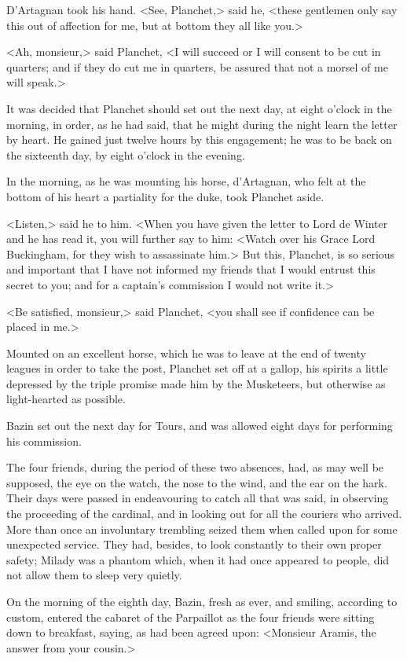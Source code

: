 D'Artagnan took his hand. <See, Planchet,> said he, <these gentlemen only say this out of affection for me, but at bottom they all like you.> 

<Ah, monsieur,> said Planchet, <I will succeed or I will consent to be cut in quarters; and if they do cut me in quarters, be assured that not a morsel of me will speak.> 

It was decided that Planchet should set out the next day, at eight o'clock in the morning, in order, as he had said, that he might during the night learn the letter by heart. He gained just twelve hours by this engagement; he was to be back on the sixteenth day, by eight o'clock in the evening. 

In the morning, as he was mounting his horse, d'Artagnan, who felt at the bottom of his heart a partiality for the duke, took Planchet aside. 

<Listen,> said he to him. <When you have given the letter to Lord de Winter and he has read it, you will further say to him: <Watch over his Grace Lord Buckingham, for they wish to assassinate him.> But this, Planchet, is so serious and important that I have not informed my friends that I would entrust this secret to you; and for a captain's commission I would not write it.>

<Be satisfied, monsieur,> said Planchet, <you shall see if confidence can be placed in me.> 

Mounted on an excellent horse, which he was to leave at the end of twenty leagues in order to take the post, Planchet set off at a gallop, his spirits a little depressed by the triple promise made him by the Musketeers, but otherwise as light-hearted as possible. 

Bazin set out the next day for Tours, and was allowed eight days for performing his commission. 

The four friends, during the period of these two absences, had, as may well be supposed, the eye on the watch, the nose to the wind, and the ear on the hark. Their days were passed in endeavouring to catch all that was said, in observing the proceeding of the cardinal, and in looking out for all the couriers who arrived. More than once an involuntary trembling seized them when called upon for some unexpected service. They had, besides, to look constantly to their own proper safety; Milady was a phantom which, when it had once appeared to people, did not allow them to sleep very quietly. 

On the morning of the eighth day, Bazin, fresh as ever, and smiling, according to custom, entered the cabaret of the Parpaillot as the four friends were sitting down to breakfast, saying, as had been agreed upon: <Monsieur Aramis, the answer from your cousin.> 

